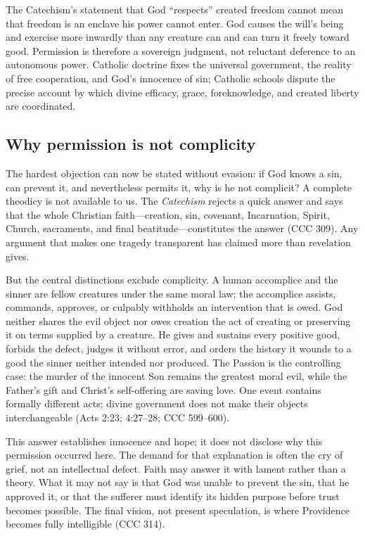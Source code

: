 The Catechism's statement that God ``respects'' created freedom cannot mean that freedom is an enclave his power cannot enter. God causes the will's being and exercise more inwardly than any creature can and can turn it freely toward good. Permission is therefore a sovereign judgment, not reluctant deference to an autonomous power. Catholic doctrine fixes the universal government, the reality of free cooperation, and God's innocence of sin; Catholic schools dispute the precise account by which divine efficacy, grace, foreknowledge, and created liberty are coordinated.

\subsection{Why permission is not complicity}

The hardest objection can now be stated without evasion: if God knows a sin,
can prevent it, and nevertheless permits it, why is he not complicit? A complete
theodicy is not available to us. The \emph{Catechism} rejects a quick answer
and says that the whole Christian faith---creation, sin, covenant,
Incarnation, Spirit, Church, sacraments, and final beatitude---constitutes the
answer (CCC 309). Any argument that makes one tragedy transparent has claimed
more than revelation gives.

But the central distinctions exclude complicity. A human accomplice and the
sinner are fellow creatures under the same moral law; the accomplice assists,
commands, approves, or culpably withholds an intervention that is owed. God
neither shares the evil object nor owes creation the act of creating or
preserving it on terms supplied by a creature. He gives and sustains every
positive good, forbids the defect, judges it without error, and orders the
history it wounds to a good the sinner neither intended nor produced. The
Passion is the controlling case: the murder of the innocent Son remains the
greatest moral evil, while the Father's gift and Christ's self-offering are
saving love. One event contains formally different acts; divine government
does not make their objects interchangeable (Acts 2:23; 4:27--28; CCC
599--600).

This answer establishes innocence and hope; it does not disclose why this
permission occurred here. The demand for that explanation is often the cry of
grief, not an intellectual defect. Faith may answer it with lament rather than
a theory. What it may not say is that God was unable to prevent the sin, that
he approved it, or that the sufferer must identify its hidden purpose before
trust becomes possible. The final vision, not present speculation, is where
Providence becomes fully intelligible (CCC 314).

